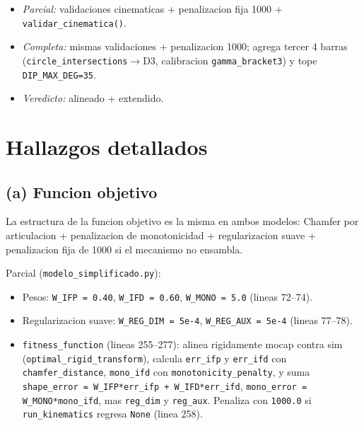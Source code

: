 \documentclass[11pt,a4paper]{article}
\newcommand{\code}[1]{\texttt{#1}}
\begin{document}
\begin{description}[leftmargin=0em,style=nextline]
\begin{itemize}[leftmargin=1.4em,nosep]
    \end{itemize}
  \item[(d) Restricciones + penalizacion]\hfill
    \begin{itemize}[leftmargin=1.4em,nosep]
      \item \emph{Parcial:} validaciones cinematicas + penalizacion fija 1000 +
            \code{validar\_cinematica()}.
      \item \emph{Completa:} mismas validaciones + penalizacion 1000; agrega
            tercer 4 barras (\code{circle\_intersections}$\to$D3, calibracion
            \code{gamma\_bracket3}) y tope \code{DIP\_MAX\_DEG=35}.
      \item \emph{Veredicto:} alineado + extendido.
    \end{itemize}
\end{description}

\section{Hallazgos detallados}

\subsection{(a) Funcion objetivo}

La estructura de la funcion objetivo es la misma en ambos modelos: Chamfer por
articulacion + penalizacion de monotonicidad + regularizacion suave +
penalizacion fija de 1000 si el mecanismo no ensambla.

Parcial (\code{modelo\_simplificado.py}):

\begin{itemize}[leftmargin=1.4em]
  \item Pesos: \code{W\_IFP = 0.40}, \code{W\_IFD = 0.60}, \code{W\_MONO = 5.0}
        (lineas 72--74).
  \item Regularizacion suave: \code{W\_REG\_DIM = 5e-4}, \code{W\_REG\_AUX = 5e-4}
        (lineas 77--78).
  \item \code{fitness\_function} (lineas 255--277): alinea rigidamente mocap
        contra sim (\code{optimal\_rigid\_transform}), calcula \code{err\_ifp} y
        \code{err\_ifd} con \code{chamfer\_distance}, \code{mono\_ifd} con
        \code{monotonicity\_penalty}, y suma
        \code{shape\_error = W\_IFP*err\_ifp + W\_IFD*err\_ifd},
        \code{mono\_error = W\_MONO*mono\_ifd}, mas \code{reg\_dim} y
        \code{reg\_aux}. Penaliza con \code{1000.0} si \code{run\_kinematics}
        regresa \code{None} (linea 258).
\end{itemize}
\end{document}
